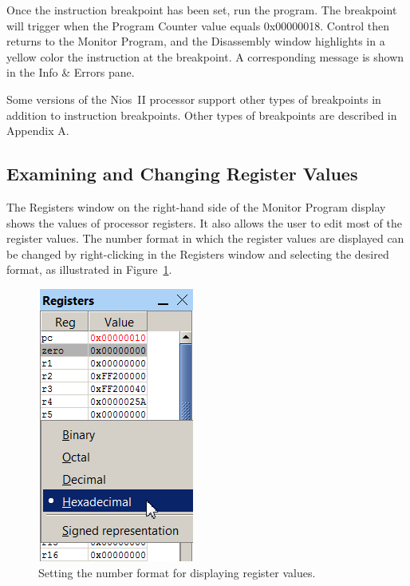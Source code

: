 \documentclass[11pt, twoside, pdftex]{article}
\begin{document}
Once the instruction breakpoint has been set, run the program.
The breakpoint will trigger when the Program Counter value equals 0x00000018. Control then returns to the Monitor Program,
and the Disassembly window highlights in a yellow color the
instruction at the breakpoint. A corresponding message is shown
in the {\sf Info \& Errors} pane.

Some versions of the Nios~II processor support other types of
breakpoints in addition to instruction breakpoints. Other types
of breakpoints are described in Appendix A.

\subsection{Examining and Changing Register Values}

The \textsf{Registers} window on the right-hand side of the
Monitor Program display shows the values of processor registers.
It also allows the user to edit most of the register values. 
The number format in which the register values are displayed
can be changed by right-clicking in the \textsf{Registers}
window and selecting the desired format, as illustrated in 
Figure~\ref{fig:18}.

\begin{figure}[H]
   \begin{center}
      \includegraphics[scale=1]{screenshots/figure18.png}
   \end{center}
   \caption{Setting the number format for displaying register values.} 
	 \label{fig:18}
\end{figure}
\end{document}
